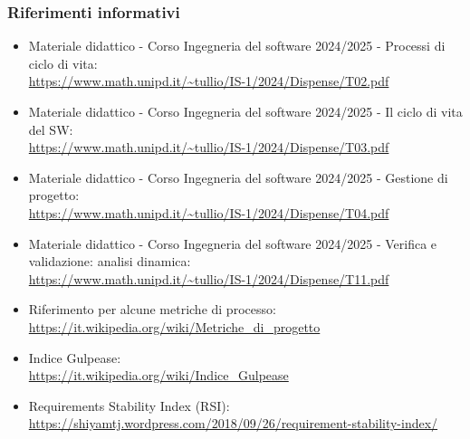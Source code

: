         \subsubsection{Riferimenti informativi}
        \begin{itemize}
            \item Materiale didattico - Corso Ingegneria del software 2024/2025 - Processi di ciclo di vita: \\ \url{https://www.math.unipd.it/~tullio/IS-1/2024/Dispense/T02.pdf}
            \item Materiale didattico - Corso Ingegneria del software 2024/2025 - Il ciclo di vita del SW: \\ \url{https://www.math.unipd.it/~tullio/IS-1/2024/Dispense/T03.pdf}
            \item Materiale didattico - Corso Ingegneria del software 2024/2025 - Gestione di progetto: \\ \url{https://www.math.unipd.it/~tullio/IS-1/2024/Dispense/T04.pdf}
            \item Materiale didattico - Corso Ingegneria del software 2024/2025 - Verifica e validazione: analisi dinamica: \\ \url{https://www.math.unipd.it/~tullio/IS-1/2024/Dispense/T11.pdf}
            \item Riferimento per alcune metriche di processo: \\ \url{https://it.wikipedia.org/wiki/Metriche_di_progetto}
            \item Indice Gulpease: \\ \url{https://it.wikipedia.org/wiki/Indice_Gulpease}
            \item Requirements Stability Index (RSI): \\ \url{https://shiyamtj.wordpress.com/2018/09/26/requirement-stability-index/}
        
        \end{itemize}